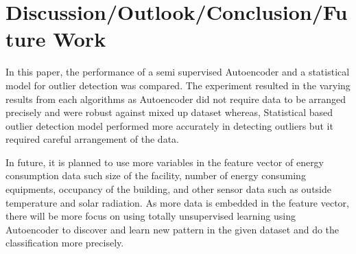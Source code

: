 \documentclass[conference]{IEEEtran}
\begin{document}
 \section{Discussion/Outlook/Conclusion/Future Work}
 
 In this paper, the performance of a semi supervised Autoencoder and a statistical model for outlier detection was compared. The experiment resulted in the varying results from each algorithms as Autoencoder did not require data to be arranged precisely and were robust against mixed up dataset whereas, Statistical based outlier detection model performed more accurately in detecting outliers but it required careful arrangement of the data.
 
  
 In future, it is planned to use more variables in the feature vector of energy consumption data such size of the facility, number of energy consuming equipments, occupancy of the building, and other sensor data such as outside temperature and solar radiation. As more data is embedded in the feature vector, there will be more focus on using totally unsupervised learning using Autoencoder to discover and learn new pattern in the given dataset and do the classification more precisely. 
 
\end{document}
